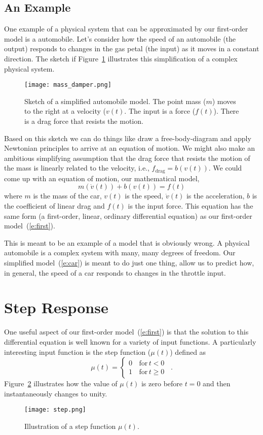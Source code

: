 \subsection{An Example}
One example of a physical system that can be approximated by our first-order model is a automobile.  Let's consider how the speed of an automobile (the output) responds to changes in the gas petal (the input) as it moves in a constant direction.  The sketch if Figure~\ref{f:massd} illustrates this simplification of a complex physical system. 
\begin{figure}[hbt!]
\centering
\texttt{[image: mass\_damper.png]}
\caption{Sketch of a simplified automobile model.  The point mass ($m$) moves to the right at a velocity ($v(t)$.  The input is a force ($f(t)$).  There is a drag force that resists the motion. }
\label{f:massd}
\end{figure}
Based on this sketch we can do things like draw a free-body-diagram and apply Newtonian principles to arrive at an equation of motion.  We might also make an ambitious simplifying assumption that the drag force that resists the motion of the mass is linearly related to the velocity, i.e., $f_{\mathrm{drag}}=b(v(t))$.  We could come up with an equation of motion, our mathematical model,
\begin{equation}
\label{e:car}
m\left(\dot{v}(t)\right) + b(v(t)) = f(t)
\end{equation}
where $m$ is the mass of the car, $v(t)$ is the speed, $\dot{v}(t)$ is the acceleration, $b$ is the coefficient of linear drag and $f(t)$ is the input force.
This equation has the same form (a first-order, linear, ordinary differential equation) as our first-order model~(\ref{e:first}).

This is meant to be an example of a model that is obviously wrong.  A physical automobile is a complex system with many, many degrees of freedom.  Our simplified model~(\ref{e:car}) is meant to do just one thing, allow us to predict how, in general, the speed of a car responds to changes in the throttle input.

\section{Step Response}\label{s:firststep}
One useful aspect of our first-order model~(\ref{e:first}) is that the solution to this differential equation is well known for a variety of input functions.  A particularly interesting input function is the \gls{step function} ($\mu(t)$) defined as
\begin{equation}
\label{e:step}
\mu(t)= \left\{ 
\begin{array}{cl}
0 & \, \mathrm{for}\, t < 0 \,\,\,\\
1 & \, \mathrm{for}\, t \geq 0
\end{array} \right.
.
\end{equation}
Figure~\ref{f:step} illustrates how the value of $\mu(t)$ is zero before $t=0$ and then instantaneously changes to unity.
\begin{figure}[hbt!]
\centering
\texttt{[image: step.png]}
\caption{Illustration of a step function $\mu(t)$.}
\label{f:step}
\end{figure}

